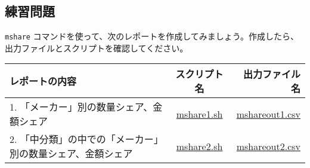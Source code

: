 \subsection{練習問題}

\verb|mshare| コマンドを使って、次のレポートを作成してみましょう。作成したら、出力ファイルとスクリプトを確認してください。

\begin{table}[htbp]
{\small
\begin{tabular}{ l | c || r }
\hline
\textbf{レポートの内容}   & \textbf{スクリプト名} & \textbf{出力ファイル名}  \\
\hline
1. 「メーカー」別の数量シェア、金額シェア & \href{exercise/mshare1.sh}{mshare1.sh} & \href{exercise/outdat/mshareout1.csv}{mshareout1.csv} \\
2. 「中分類」の中での「メーカー」別の数量シェア、金額シェア & \href{exercise/mshare2.sh}{mshare2.sh} & \href{exercise/outdat/mshareout2.csv}{mshareout2.csv} \\


\hline
\end{tabular} 
}
\end{table} 


%
